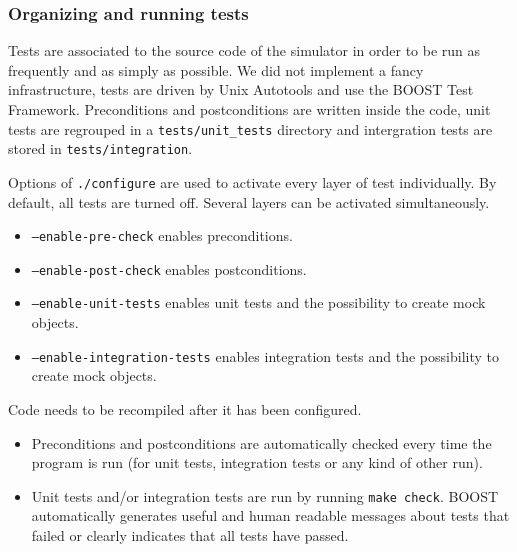 \subsubsection{Organizing and running tests}

Tests are associated to the source code of the simulator in order to be run as frequently and as simply as possible. We did not implement a fancy infrastructure, tests are driven by Unix Autotools and use the BOOST Test Framework. Preconditions and postconditions are written inside the code, unit tests are regrouped in a \texttt{tests/unit\_tests} directory and intergration tests are stored in \texttt{tests/integration}.

Options of \texttt{./configure} are used to activate every layer of test individually. By default, all tests are turned off. Several layers can be activated simultaneously.
\begin{itemize}
  \item \texttt{--enable-pre-check} enables preconditions.
  \item \texttt{--enable-post-check} enables postconditions.
  \item \texttt{--enable-unit-tests} enables unit tests and the possibility to create mock objects.
  \item \texttt{--enable-integration-tests} enables integration tests and the possibility to create mock objects.
\end{itemize}

Code needs to be recompiled after it has been configured.
\begin{itemize}
  \item Preconditions and postconditions are automatically checked every time the program is run (for unit tests, integration tests or any kind of other run).
  \item Unit tests and/or integration tests are run by running \texttt{make check}. BOOST automatically generates useful and human readable messages about tests that failed or clearly indicates that all tests have passed.
\end{itemize}
